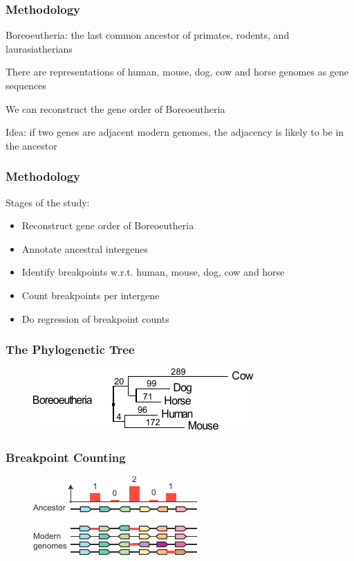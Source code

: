 \documentclass[svgnames,14pt]{beamer}
\begin{document}
\begin{frame}
\frametitle{Methodology}
Boreoeutheria: the last common ancestor of primates, rodents, and laurasiatherians

\vspace{12pt}
There are representations of  human, mouse, dog, cow and horse genomes as gene sequences

\vspace{12pt}
We can reconstruct the gene order of Boreoeutheria

\vspace{12pt}
Idea: if two genes are adjacent modern genomes, the adjacency is likely to be in the ancestor
\end{frame}

\begin{frame}
\frametitle{Methodology}
\vspace{12pt}
Stages of the study:
\begin{itemize}
\item Reconstruct gene order of Boreoeutheria
\item Annotate ancestral intergenes
\item Identify breakpoints w.r.t. human, mouse, dog, cow and horse
\item Count breakpoints per intergene
\item Do regression of breakpoint counts
\end{itemize}
\end{frame}

\begin{frame}
\frametitle{The Phylogenetic Tree}
\begin{figure}
	\centering
	\includegraphics[scale = 2.0]{BreakCount.pdf}
\end{figure}
\end{frame}

\begin{frame}
\frametitle{Breakpoint Counting}
\begin{figure}
	\centering
	\includegraphics[scale = 2.40]{Ancestor.pdf}
\end{figure}
\end{frame}
\end{document}
